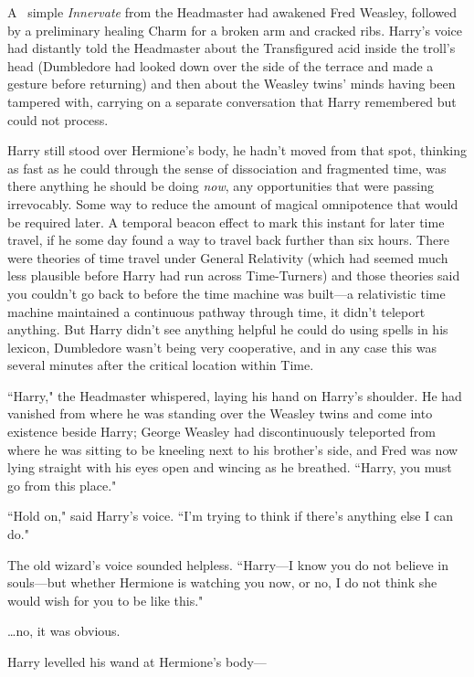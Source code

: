 
\lettrine{A}{~} simple \emph{Innervate} from the Headmaster had awakened Fred Weasley, followed by a preliminary healing Charm for a broken arm and cracked ribs. Harry's voice had distantly told the Headmaster about the Transfigured acid inside the troll's head (Dumbledore had looked down over the side of the terrace and made a gesture before returning) and then about the Weasley twins' minds having been tampered with, carrying on a separate conversation that Harry remembered but could not process.

Harry still stood over Hermione's body, he hadn't moved from that spot, thinking as fast as he could through the sense of dissociation and fragmented time, was there anything he should be doing \emph{now}, any opportunities that were passing irrevocably. Some way to reduce the amount of magical omnipotence that would be required later. A temporal beacon effect to mark this instant for later time travel, if he some day found a way to travel back further than six hours. There were theories of time travel under General Relativity (which had seemed much less plausible before Harry had run across Time-Turners) and those theories said you couldn't go back to before the time machine was built---a relativistic time machine maintained a continuous pathway through time, it didn't teleport anything. But Harry didn't see anything helpful he could do using spells in his lexicon, Dumbledore wasn't being very cooperative, and in any case this was several minutes after the critical location within Time.

``Harry," the Headmaster whispered, laying his hand on Harry's shoulder. He had vanished from where he was standing over the Weasley twins and come into existence beside Harry; George Weasley had discontinuously teleported from where he was sitting to be kneeling next to his brother's side, and Fred was now lying straight with his eyes open and wincing as he breathed. ``Harry, you must go from this place."

``Hold on," said Harry's voice. ``I'm trying to think if there's anything else I can do."

The old wizard's voice sounded helpless. ``Harry---I know you do not believe in souls---but whether Hermione is watching you now, or no, I do not think she would wish for you to be like this."

{\ldots}no, it was obvious.

Harry levelled his wand at Hermione's body---

